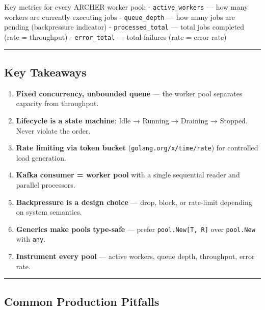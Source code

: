 \documentclass[11pt,a4paper,oneside]{book}
\providecommand{\tightlist}{\setlength{\itemsep}{0pt}\setlength{\parskip}{0pt}}
\begin{document}
Key metrics for every ARCHER worker pool: - \texttt{active\_workers} ---
how many workers are currently executing jobs - \texttt{queue\_depth}
--- how many jobs are pending (backpressure indicator) -
\texttt{processed\_total} --- total jobs completed (rate = throughput) -
\texttt{error\_total} --- total failures (rate = error rate)

\begin{center}\rule{0.5\linewidth}{0.5pt}\end{center}

\subsection{Key Takeaways}

\begin{enumerate}
\def\labelenumi{\arabic{enumi}.}
\tightlist
\item
  \textbf{Fixed concurrency, unbounded queue} --- the worker pool
  separates capacity from throughput.
\item
  \textbf{Lifecycle is a state machine}: Idle → Running → Draining →
  Stopped. Never violate the order.
\item
  \textbf{Rate limiting via token bucket}
  (\texttt{golang.org/x/time/rate}) for controlled load generation.
\item
  \textbf{Kafka consumer = worker pool} with a single sequential reader
  and parallel processors.
\item
  \textbf{Backpressure is a design choice} --- drop, block, or
  rate-limit depending on system semantics.
\item
  \textbf{Generics make pools type-safe} --- prefer
  \texttt{pool.New{[}T,\ R{]}} over \texttt{pool.New} with \texttt{any}.
\item
  \textbf{Instrument every pool} --- active workers, queue depth,
  throughput, error rate.
\end{enumerate}

\begin{center}\rule{0.5\linewidth}{0.5pt}\end{center}

\subsection{Common Production
Pitfalls}
\end{document}
